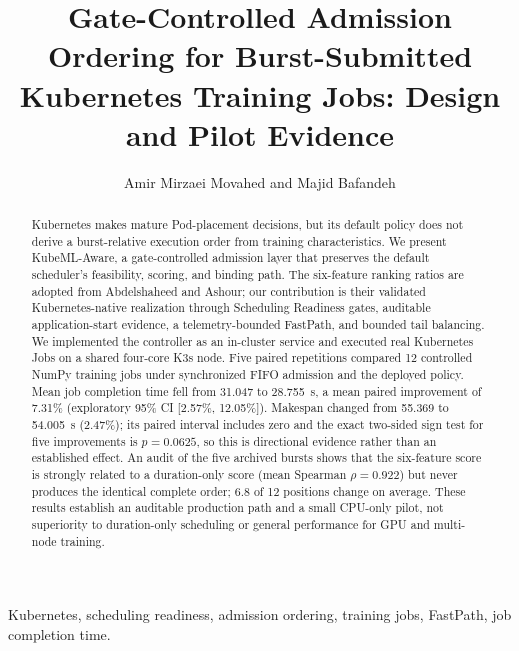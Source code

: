 \documentclass[10pt,journal,compsoc]{IEEEtran}
\newcommand{\system}{KubeML-Aware}
\begin{document}
\title{Gate-Controlled Admission Ordering for Burst-Submitted Kubernetes Training Jobs: Design and Pilot Evidence}

\author{Amir Mirzaei Movahed and Majid Bafandeh%
}

\maketitle

\begin{abstract}
Kubernetes makes mature Pod-placement decisions, but its default policy does not derive a burst-relative execution order from training characteristics. We present \system, a gate-controlled admission layer that preserves the default scheduler's feasibility, scoring, and binding path. The six-feature ranking ratios are adopted from Abdelshaheed and Ashour; our contribution is their validated Kubernetes-native realization through Scheduling Readiness gates, auditable application-start evidence, a telemetry-bounded FastPath, and bounded tail balancing. We implemented the controller as an in-cluster service and executed real Kubernetes Jobs on a shared four-core K3s node. Five paired repetitions compared 12 controlled NumPy training jobs under synchronized FIFO admission and the deployed policy. Mean job completion time fell from 31.047 to 28.755~s, a mean paired improvement of 7.31\% (exploratory 95\% CI [2.57\%, 12.05\%]). Makespan changed from 55.369 to 54.005~s (2.47\%); its paired interval includes zero and the exact two-sided sign test for five improvements is $p=0.0625$, so this is directional evidence rather than an established effect. An audit of the five archived bursts shows that the six-feature score is strongly related to a duration-only score (mean Spearman $\rho=0.922$) but never produces the identical complete order; 6.8 of 12 positions change on average. These results establish an auditable production path and a small CPU-only pilot, not superiority to duration-only scheduling or general performance for GPU and multi-node training.
\end{abstract}

\begin{IEEEkeywords}
Kubernetes, scheduling readiness, admission ordering, training jobs, FastPath, job completion time.
\end{IEEEkeywords}
\end{document}

